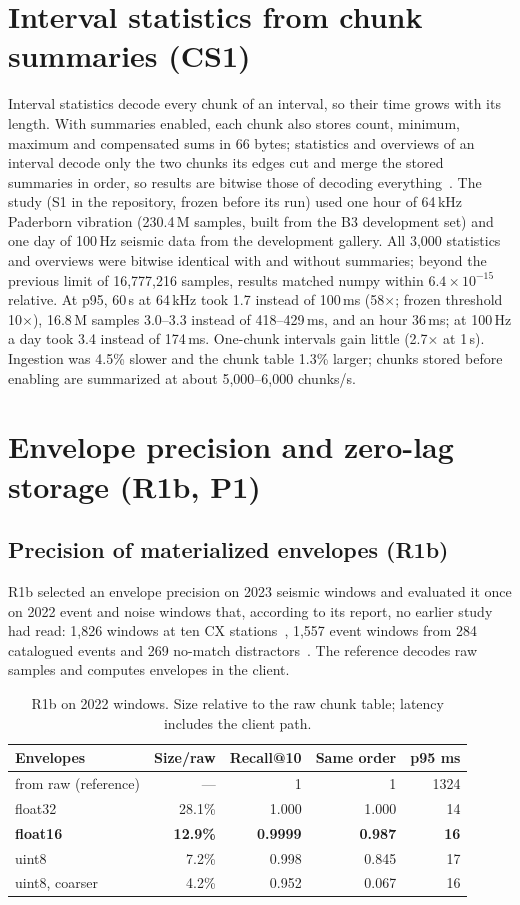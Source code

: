 \documentclass[sigconf,nonacm]{acmart}
\begin{document}
\section{Interval statistics from chunk summaries (CS1)}\label{sec:cs1}
Interval statistics decode every chunk of an interval, so their time grows with its length. With summaries enabled, each chunk also stores count, minimum, maximum and compensated sums in 66 bytes; statistics and overviews of an interval decode only the two chunks its edges cut and merge the stored summaries in order, so results are bitwise those of decoding everything~\cite{cs1}. The study (S1 in the repository, frozen before its run) used one hour of 64\,kHz Paderborn vibration (230.4\,M samples, built from the B3 development set) and one day of 100\,Hz seismic data from the development gallery. All 3,000 statistics and overviews were bitwise identical with and without summaries; beyond the previous limit of 16,777,216 samples, results matched numpy within $6.4\times10^{-15}$ relative. At p95, 60\,s at 64\,kHz took 1.7 instead of 100\,ms (58$\times$; frozen threshold 10$\times$), 16.8\,M samples 3.0--3.3 instead of 418--429\,ms, and an hour 36\,ms; at 100\,Hz a day took 3.4 instead of 174\,ms. One-chunk intervals gain little (2.7$\times$ at 1\,s). Ingestion was 4.5\% slower and the chunk table 1.3\% larger; chunks stored before enabling are summarized at about 5,000--6,000 chunks/s.

\section{Envelope precision and zero-lag storage (R1b, P1)}
\subsection{Precision of materialized envelopes (R1b)}
R1b selected an envelope precision on 2023 seismic windows and evaluated it once on 2022 event and noise windows that, according to its report, no earlier study had read: 1,826 windows at ten CX stations~\cite{ipoc}, 1,557 event windows from 284 catalogued events and 269 no-match distractors~\cite{r1b}. The reference decodes raw samples and computes envelopes in the client.

\begin{table}[t]
\caption{R1b on 2022 windows. Size relative to the raw chunk table; latency includes the client path.}
\label{tab:r1b}
\small\setlength{\tabcolsep}{4pt}
\begin{tabular}{@{}lrrrr@{}}
\toprule
Envelopes & Size/raw & Recall@10 & Same order & p95 ms \\
\midrule
from raw (reference) & --- & 1 & 1 & 1324 \\
float32 & 28.1\% & 1.000 & 1.000 & 14 \\
\textbf{float16} & \textbf{12.9\%} & \textbf{0.9999} & \textbf{0.987} & \textbf{16} \\
uint8 & 7.2\% & 0.998 & 0.845 & 17 \\
uint8, coarser & 4.2\% & 0.952 & 0.067 & 16 \\
\bottomrule
\end{tabular}
\end{table}
\end{document}
